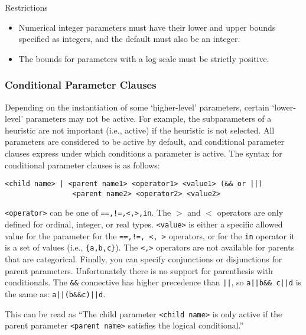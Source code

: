 \documentclass[manual.tex]{subfiles}
\begin{document}
\begin{bclogo}[logo=\bcattention, couleurBarre=red, noborder=true]{Restrictions}
\begin{itemize} 
	\item Numerical integer parameters must have their lower and upper bounds specified as integers, and the default must also be an integer.
	\item The bounds for parameters with a log scale must be strictly positive.
\end{itemize}
\end{bclogo}

\subsubsection{Conditional Parameter Clauses}

Depending on the instantiation of some `higher-level' parameters, certain `lower-level' parameters may not be active.
For example, the subparameters of a heuristic are not important (i.e., active) if the heuristic is not selected.
%
All parameters are considered to be active by default, and conditional parameter clauses express 
under which conditions a parameter is active. The syntax for conditional parameter clauses is as follows:

\begin{verbatim}
<child name> | <parent name1> <operator1> <value1> (&& or ||) 
				<parent name2> <operator2> <value2>
\end{verbatim}

\texttt{<operator>} can be one of \texttt{==,!=,<,>,in}. The $>$ and $<$ operators are only defined for ordinal, integer, or real types. \texttt{<value>} is either a specific allowed value for the parameter for the \texttt{==,!=, <, >} operators, or for the \texttt{in} operator it is a set of values (i.e., \texttt{\{a,b,c\}}).  The \texttt{<,>} operators are not available for parents that are categorical. Finally, you can specify conjunctions or disjunctions for parent parameters. Unfortunately there is no support for parenthesis with conditionals. The \texttt{\&\&} connective has higher precedence than \texttt{||}, so  \texttt{a||b\&\& c||d} is the same as: \texttt{a||(b\&\&\!c)||d}.

%
This can be read as ``The child parameter \texttt{<child name>} is only active if the parent parameter \texttt{<parent name>} satisfies the logical conditional.''
\end{document}

